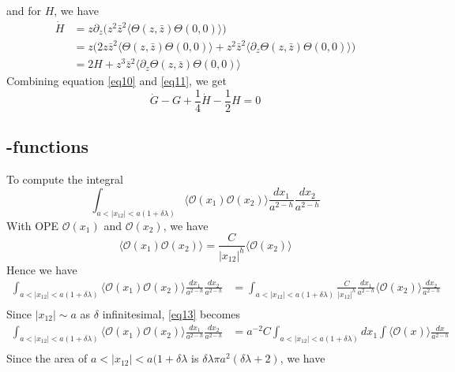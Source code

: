 and for $H$, we have
\begin{equation}
\label{eq11}
	\begin{split}
	\dot{H} & = z \partial_z \big( z^2 \bar{z}^2 \langle \Theta(z,\bar{z}) \Theta(0,0) \rangle \big)\\
	& =z \big(2 z \bar{z}^2 \langle \Theta (z,\bar{z}) \Theta(0,0) \rangle + z^2 \bar{z}^2 \langle \partial_z \Theta(z,\bar{z}) \Theta(0,0) \rangle \big)\\
	& = 2H + z^3 \bar{z}^2 \langle \partial_z \Theta(z,\bar{z}) \Theta(0,0)\rangle 
	\end{split}
\end{equation}
Combining equation \ref{eq10} and \ref{eq11}, we get 
\[
\dot{G} - G + \frac{1}{4} \dot{H} - \frac{1}{2} H =0
\]
\subsection{\beta-functions}
To compute the integral 
\[
\int_{a < |x_{12}| < a(1+\delta \lambda)} \langle \mathcal{O}(x_1) \mathcal{O}(x_2) \rangle \frac{d x_1}{a^{2-h}} \frac{d x_2}{a^{2-h}}
\]
With OPE $\mathcal{O}(x_1)$ and $\mathcal{O}(x_2)$, we have 
\begin{equation}
	\langle \mathcal{O}(x_1) \mathcal{O}(x_2) \rangle = \frac{C}{|x_{12}|^h} \langle\mathcal{O}(x_2)\rangle
\end{equation} 
Hence we have
\begin{equation}
\label{eq13}
	\begin{split}
	\int_{a < |x_{12} | < a(1+\delta\lambda)} \langle \mathcal{O}(x_1) \mathcal{O}(x_2) \rangle \frac{d x_1}{a^{2-h}} \frac{d x_2}{a^{2-h}} &= \int_{a < |x_{12} | < a(1+\delta\lambda)} \frac{C}{|x_{12}|^h} \frac{dx_1}{a^{2-h}} \langle \mathcal{O}(x_2) \rangle  \frac{dx_2}{a^{2-h}}\\
	&
	\end{split}
\end{equation}
Since $|x_{12}| \sim a$ as $\delta$ infinitesimal, \ref{eq13} becomes 
\begin{equation}
	\begin{split}
	\int_{a < |x_{12} | < a(1+\delta\lambda)} \langle \mathcal{O}(x_1) \mathcal{O}(x_2) \rangle \frac{d x_1}{a^{2-h}} \frac{d x_2}{a^{2-h}} & = a^{-2}C \int_{a < |x_{12} | < a(1+\delta\lambda)} dx_1 \int \langle \mathcal{O}(x) \rangle \frac{dx}{a^{2-h}}\\
	\end{split}
\end{equation}
Since the area of $a < |x_{12} | < a(1+\delta\lambda $ is $\delta \lambda \pi a^2 (\delta \lambda +2)$, we have
